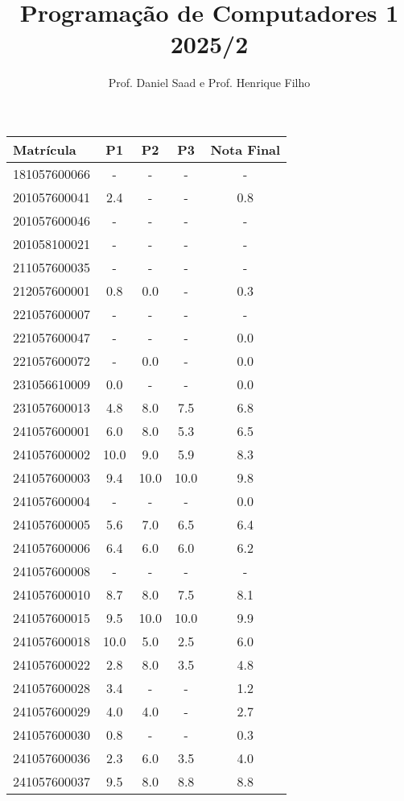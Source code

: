 \documentclass{article}
\title{ Programação de Computadores 1 2025/2}
\date{}
\author{ Prof. Daniel Saad e Prof. Henrique Filho}
\begin{document}
 \maketitle
    \begin{longtable}{|l|c|c|c|c|}
    \hline
Matrícula & P1 & P2 & P3 & Nota Final\\\hline \endhead   
181057600066 & - & - & - & -\\\hline
201057600041 & 2.4 & - & - & 0.8\\\hline
201057600046 & - & - & - & -\\\hline
201058100021 & - & - & - & -\\\hline
211057600035 & - & - & - & -\\\hline
212057600001 & 0.8 & 0.0 & - & 0.3\\\hline
221057600007 & - & - & - & -\\\hline
221057600047 & - & - & - & 0.0\\\hline
221057600072 & - & 0.0 & - & 0.0\\\hline
231056610009 & 0.0 & - & - & 0.0\\\hline
231057600013 & 4.8 & 8.0 & 7.5 & 6.8\\\hline
241057600001 & 6.0 & 8.0 & 5.3 & 6.5\\\hline
241057600002 & 10.0 & 9.0 & 5.9 & 8.3\\\hline
241057600003 & 9.4 & 10.0 & 10.0 & 9.8\\\hline
241057600004 & - & - & - & 0.0\\\hline
241057600005 & 5.6 & 7.0 & 6.5 & 6.4\\\hline
241057600006 & 6.4 & 6.0 & 6.0 & 6.2\\\hline
241057600008 & - & - & - & -\\\hline
241057600010 & 8.7 & 8.0 & 7.5 & 8.1\\\hline
241057600015 & 9.5 & 10.0 & 10.0 & 9.9\\\hline
241057600018 & 10.0 & 5.0 & 2.5 & 6.0\\\hline
241057600022 & 2.8 & 8.0 & 3.5 & 4.8\\\hline
241057600028 & 3.4 & - & - & 1.2\\\hline
241057600029 & 4.0 & 4.0 & - & 2.7\\\hline
241057600030 & 0.8 & - & - & 0.3\\\hline
241057600036 & 2.3 & 6.0 & 3.5 & 4.0\\\hline
241057600037 & 9.5 & 8.0 & 8.8 & 8.8\\\hline

\end{longtable}
\end{document}
